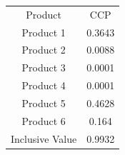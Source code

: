 \begin{tabular}{cc}
Product & CCP \\
Product 1 & 0.3643 \\
Product 2 & 0.0088 \\
Product 3 & 0.0001 \\
Product 4 & 0.0001 \\
Product 5 & 0.4628 \\
Product 6 & 0.164 \\
Inclusive Value & 0.9932 \\
\end{tabular}